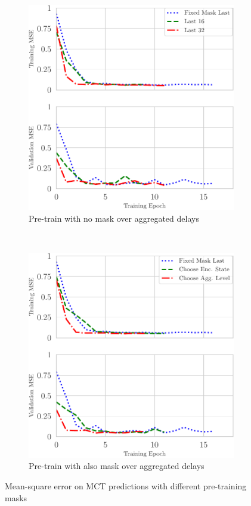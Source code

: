 \documentclass{beamer}
\begin{document}
{\begin{frame}
\begin{figure}[h]
    \centering
    \begin{subfigure}[h]{0.5\textwidth}
        \centering
        \includegraphics[scale=0.5]{figures/finetune_mct_loss_comparison.pdf}
        \caption{Pre-train with no mask over aggregated delays}
    \end{subfigure}%
    ~ 
    \begin{subfigure}[h]{0.5\textwidth}
        \centering
        \includegraphics[scale=0.5]{figures/finetune_mct_loss_comparison_agg.pdf}
        \caption{Pre-train with also mask over aggregated delays}
    \end{subfigure}
    \caption{Mean-square error on MCT predictions with different pre-training masks}
    \label{fig:mct_mask}
\end{figure}
\end{frame}

}
\end{document}
